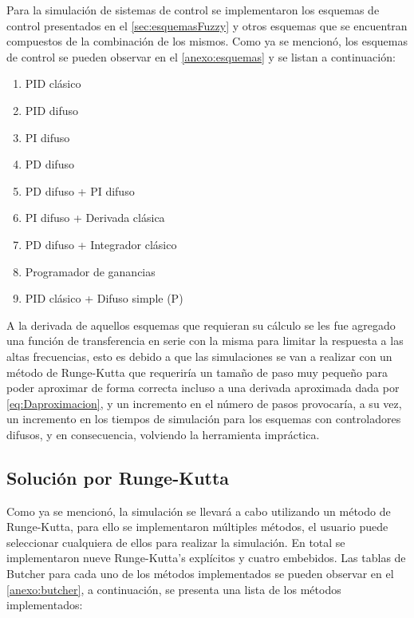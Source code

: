         Para la simulación de sistemas de control se implementaron los esquemas de control presentados en el \cref{sec:esquemasFuzzy} y otros esquemas que se encuentran compuestos de la combinación de los mismos. Como ya se mencionó, los esquemas de control se pueden observar en el \ref{anexo:esquemas} y se listan a continuación:

        \begin{enumerate}[leftmargin=\parindent]
            \item PID clásico
            \item PID difuso
            \item PI difuso
            \item PD difuso
            \item PD difuso + PI difuso
            \item PI difuso + Derivada clásica
            \item PD difuso + Integrador clásico
            \item Programador de ganancias
            \item PID clásico + Difuso simple (P)
        \end{enumerate}

        A la derivada de aquellos esquemas que requieran su cálculo se les fue agregado una función de transferencia en serie con la misma para limitar la respuesta a las altas frecuencias, esto es debido a que las simulaciones se van a realizar con un método de Runge-Kutta que requeriría un tamaño de paso muy pequeño para poder aproximar de forma correcta incluso a una derivada aproximada dada por \cref{eq:Daproximacion}, y un incremento en el número de pasos provocaría, a su vez, un incremento en los tiempos de simulación para los esquemas con controladores difusos, y en consecuencia, volviendo la herramienta impráctica.

    \subsection{Solución por Runge-Kutta}

        Como ya se mencionó, la simulación se llevará a cabo utilizando un método de Runge-Kutta, para ello se implementaron múltiples métodos, el usuario puede seleccionar cualquiera de ellos para realizar la simulación. En total se implementaron nueve Runge-Kutta's explícitos y cuatro embebidos. Las tablas de Butcher para cada uno de los métodos implementados se pueden observar en el \ref{anexo:butcher}, a continuación, se presenta una lista de los métodos implementados:

